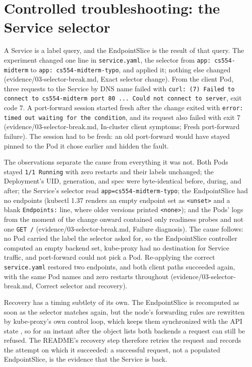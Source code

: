 \documentclass[11pt,letterpaper]{article}
\newcommand{\evid}[2]{\textsf{\footnotesize(evidence/#1, #2)}}
\newcommand{\code}[1]{\texttt{#1}}
\begin{document}
\section{Controlled troubleshooting: the Service selector}

A Service is a label query, and the EndpointSlice is the result of that query. The experiment changed one line in \code{service.yaml}, the selector from \code{app: cs554-midterm} to \code{app: cs554-midterm-typo}, and applied it; nothing else changed \evid{03-selector-break.md}{Exact selector change}. From the client Pod, three requests to the Service by DNS name failed with \code{curl: (7) Failed to connect to cs554-midterm port 80 ... Could not connect to server}, exit code 7. A port-forward session started fresh after the change exited with \code{error: timed out waiting for the condition}, and its request also failed with exit 7 \evid{03-selector-break.md}{In-cluster client symptoms; Fresh port-forward failure}. The session had to be fresh: an old port-forward would have stayed pinned to the Pod it chose earlier and hidden the fault.

The observations separate the cause from everything it was not. Both Pods stayed \code{1/1 Running} with zero restarts and their labels unchanged; the Deployment's UID, generation, and spec were byte-identical before, during, and after; the Service's selector read \code{app=cs554-midterm-typo}; the EndpointSlice had no endpoints (kubectl 1.37 renders an empty endpoint set as \code{<unset>} and a blank \code{Endpoints:} line, where older versions printed \code{<none>}); and the Pods' logs from the moment of the change onward contained only readiness probes and not one \code{GET /} \evid{03-selector-break.md}{Failure diagnosis}. The cause follows: no Pod carried the label the selector asked for, so the EndpointSlice controller computed an empty backend set, kube-proxy had no destination for Service traffic, and port-forward could not pick a Pod. Re-applying the correct \code{service.yaml} restored two endpoints, and both client paths succeeded again, with the same Pod names and zero restarts throughout \evid{03-selector-break.md}{Correct selector and recovery}.

Recovery has a timing subtlety of its own. The EndpointSlice is recomputed as soon as the selector matches again, but the node's forwarding rules are rewritten by kube-proxy's own control loop, which keeps them synchronized with the API state \cite{k8s-virtual-ips}, so for an instant after the object lists both backends a request can still be refused. The README's recovery step therefore retries the request and records the attempt on which it succeeded: a successful request, not a populated EndpointSlice, is the evidence that the Service is back.
\end{document}
